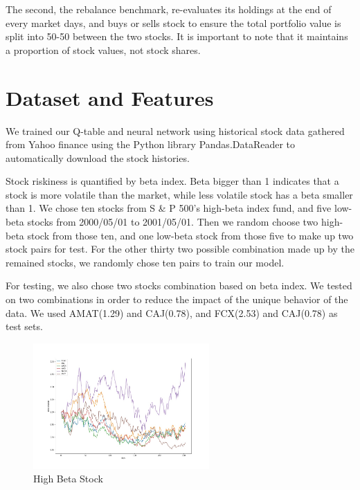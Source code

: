 The second, the rebalance benchmark, re-evaluates its holdings at the end of every market days, and buys or sells stock to ensure the total portfolio value is split into 50-50 between the two stocks. It is important to note that it maintains a proportion of stock values, not stock shares.

\section{Dataset and Features}
We trained our Q-table and neural network using historical stock data gathered from Yahoo finance using the Python library Pandas.DataReader to automatically download the stock histories. 

Stock riskiness is quantified by beta index. Beta bigger than 1 indicates that a stock is more volatile than the market, while less volatile stock has a beta smaller than 1. We chose ten stocks from S \& P 500’s high-beta index fund, and five low-beta stocks from 2000/05/01 to 2001/05/01. Then we random choose two high-beta stock from those ten, and one low-beta stock from those five to make up two stock pairs for test. For the other thirty two possible combination made up by the remained stocks, we randomly chose ten pairs to train our model. 

For testing, we also chose two stocks combination based on beta index. We tested on two combinations in order to reduce the impact of the unique behavior of the data. We used AMAT(1.29) and CAJ(0.78), and FCX(2.53) and CAJ(0.78) as test sets. 

\begin{figure}[h]
\begin{center}
\includegraphics[clip, width=0.6\textwidth]{Graphics/highbeta_pricechange.jpg} \caption{High Beta Stock}
\end{center}
\end{figure}

